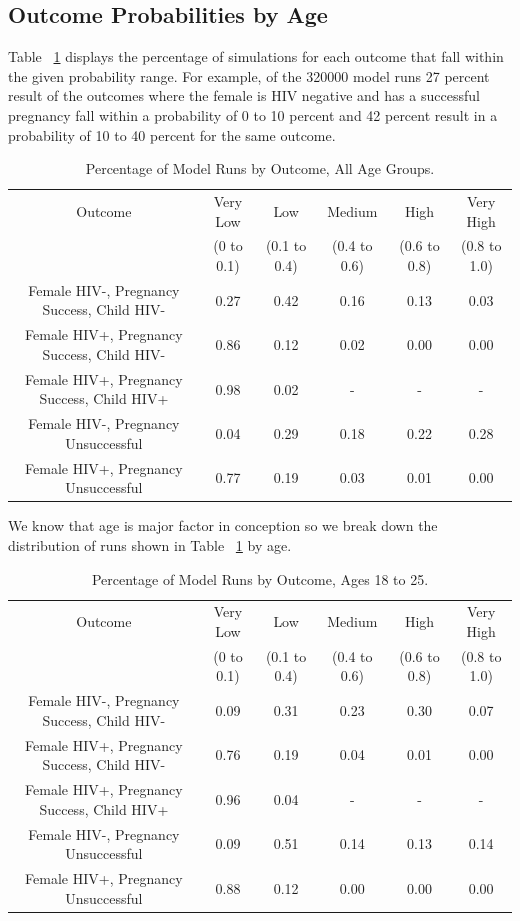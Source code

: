 \documentclass[11pt]{nih_mod}
\begin{document}
\subsection{Outcome Probabilities by Age}
Table ~\ref{tab:outcomefreqs} displays the percentage of simulations for each outcome that fall within the given probability range.  For example, of the 320000 model runs 27 percent result of the outcomes where the female is HIV negative and has a successful pregnancy fall within a probability of 0 to 10 percent and 42 percent result in a probability of 10 to 40 percent for the same outcome.  
\begin{table} [H]	
\begin{center}
\begin{tabular}{|c|c|c|c|c|c|}
\hline
Outcome & Very Low& Low & Medium& High& Very High\\
 & (0 to 0.1) & (0.1 to 0.4) & (0.4 to 0.6) & (0.6 to 0.8) & (0.8 to 1.0)\\
\hline
\hline
Female HIV-, Pregnancy Success, Child HIV- & 0.27& 0.42 & 0.16 & 0.13 & 0.03\\
Female HIV+, Pregnancy Success, Child HIV- & 0.86 & 0.12 & 0.02 & 0.00 & 0.00\\
Female HIV+, Pregnancy Success, Child HIV+ & 0.98 & 0.02 & - & - &- \\
Female HIV-, Pregnancy Unsuccessful & 0.04 & 0.29 & 0.18 & 0.22 & 0.28 \\
Female HIV+, Pregnancy Unsuccessful & 0.77 & 0.19 & 0.03 & 0.01 & 0.00\\
\hline
\end{tabular}
	\caption{Percentage of Model Runs by Outcome, All Age Groups. \label{tab:outcomefreqs}}
\end{center}
\end{table} 

We know that age is major factor in conception so we break down the distribution of runs shown in Table ~\ref{tab:outcomefreqs} by age. 

\begin{table}[H]
\begin{center}
\begin{tabular}{|c|c|c|c|c|c|}
\hline
Outcome & Very Low& Low & Medium& High& Very High\\
 & (0 to 0.1) & (0.1 to 0.4) & (0.4 to 0.6) & (0.6 to 0.8) & (0.8 to 1.0)\\
\hline
\hline
Female HIV-, Pregnancy Success, Child HIV- & 0.09& 0.31 & 0.23 & 0.30 & 0.07\\
Female HIV+, Pregnancy Success, Child HIV- & 0.76 & 0.19 & 0.04 & 0.01 & 0.00\\
Female HIV+, Pregnancy Success, Child HIV+ & 0.96 & 0.04 & - & - &- \\
Female HIV-, Pregnancy Unsuccessful & 0.09 & 0.51 & 0.14 & 0.13 & 0.14 \\
Female HIV+, Pregnancy Unsuccessful & 0.88 & 0.12 & 0.00 & 0.00 & 0.00\\
\hline
\end{tabular}
	\caption{Percentage of Model Runs by Outcome, Ages 18 to 25. \label{tab:outcomefreqs18}}
\end{center}
\end{table} 
\end{document}
